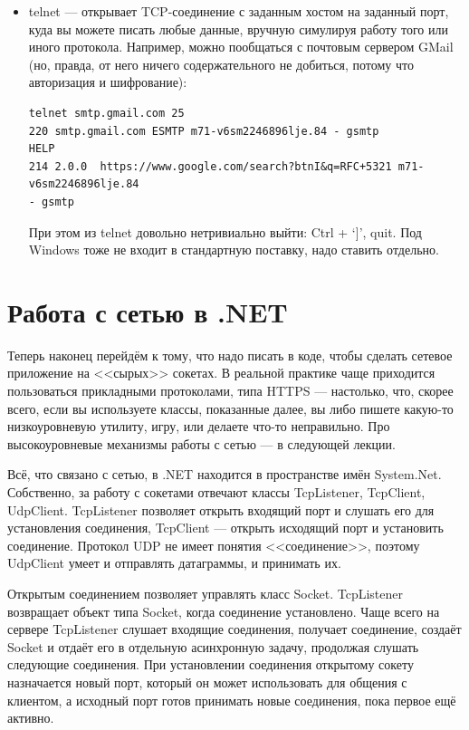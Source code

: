 \documentclass[a5paper]{article}
\begin{document}
\begin{itemize}
    \item telnet --- открывает TCP-соединение с заданным хостом на заданный порт, куда вы можете писать любые данные, вручную симулируя работу того или иного протокола. Например, можно пообщаться с почтовым сервером GMail (но, правда, от него ничего содержательного не добиться, потому что авторизация и шифрование):
        \begin{verbatim}
telnet smtp.gmail.com 25
220 smtp.gmail.com ESMTP m71-v6sm2246896lje.84 - gsmtp
HELP
214 2.0.0  https://www.google.com/search?btnI&q=RFC+5321 m71-v6sm2246896lje.84 
- gsmtp
        \end{verbatim}
        При этом из telnet довольно нетривиально выйти: Ctrl + `]', quit. Под Windows тоже не входит в стандартную поставку, надо ставить отдельно.
\end{itemize}

\section{Работа с сетью в .NET}

Теперь наконец перейдём к тому, что надо писать в коде, чтобы сделать сетевое приложение на <<сырых>> сокетах. В реальной практике чаще приходится пользоваться прикладными протоколами, типа HTTPS --- настолько, что, скорее всего, если вы используете классы, показанные далее, вы либо пишете какую-то низкоуровневую утилиту, игру, или делаете что-то неправильно. Про высокоуровневые механизмы работы с сетью --- в следующей лекции.

Всё, что связано с сетью, в .NET находится в пространстве имён System.Net. Собственно, за работу с сокетами отвечают классы TcpListener, TcpClient, UdpClient. TcpListener позволяет открыть входящий порт и слушать его для установления соединения, TcpClient --- открыть исходящий порт и установить соединение. Протокол UDP не имеет понятия <<соединение>>, поэтому UdpClient умеет и отправлять датаграммы, и принимать их.

Открытым соединением позволяет управлять класс Socket. TcpListener возвращает объект типа Socket, когда соединение установлено. Чаще всего на сервере TcpListener слушает входящие соединения, получает соединение, создаёт Socket и отдаёт его в отдельную асинхронную задачу, продолжая слушать следующие соединения. При установлении соединения открытому сокету назначается новый порт, который он может использовать для общения с клиентом, а исходный порт готов принимать новые соединения, пока первое ещё активно.
\end{document}
